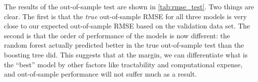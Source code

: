 \documentclass[11pt, fleqn]{article}
\begin{document}
The results of the out-of-sample test are shown in \cref{tab:rmse_test}. Two things are clear. The first is that the \textit{true} out-of-sample RMSE for all three models is very close to our expected out-of-sample RMSE based on the validation data set. The second is that the order of performance of the models is now different: the random forest actually predicted better in the true out-of-sample test than the boosting tree did. This suggests that at the margin, we can differentiate what is the ``best'' model by other factors like tractability and computational expense, and out-of-sample performance will not suffer much as a result.




\end{document}
